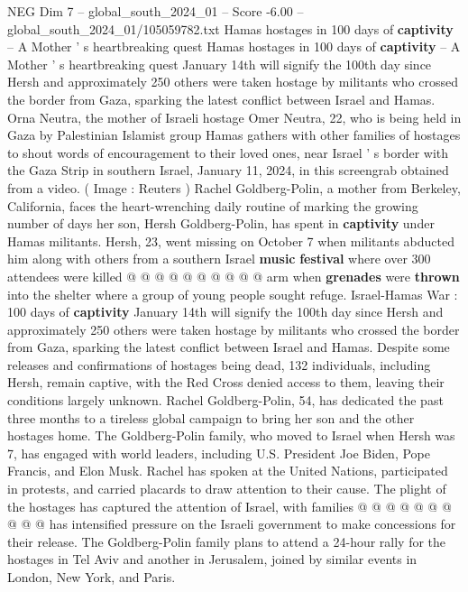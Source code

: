 \begin{textsample}{NEG Dim 7 – global\_south\_2024\_01 – Score -6.00 – global\_south\_2024\_01/105059782.txt}  \label{ex:f7_neg_404}
Hamas hostages in 100 days of \textbf{captivity} -- A Mother ' s heartbreaking quest Hamas hostages in 100 days of \textbf{captivity} -- A Mother ' s heartbreaking quest January 14th will signify the 100th day since Hersh and approximately 250 others were taken hostage by militants who crossed the border from Gaza, sparking the latest conflict between Israel and Hamas.
Orna Neutra, the mother of Israeli hostage Omer Neutra, 22, who is being held in Gaza by Palestinian Islamist group Hamas gathers with other families of hostages to shout words of encouragement to their loved ones, near Israel ' s border with the Gaza Strip in southern Israel, January 11, 2024, in this screengrab obtained from a video. ( Image : Reuters ) Rachel Goldberg-Polin, a mother from Berkeley, California, faces the heart-wrenching daily routine of marking the growing number of days her son, Hersh Goldberg-Polin, has spent in \textbf{captivity} under Hamas militants.
Hersh, 23, went missing on October 7 when militants abducted him along with others from a southern Israel \textbf{music} \textbf{festival} where over 300 attendees were killed @ @ @ @ @ @ @ @ @ @ arm when \textbf{grenades} were \textbf{thrown} into the shelter where a group of young people sought refuge.
Israel-Hamas War : 100 days of \textbf{captivity} January 14th will signify the 100th day since Hersh and approximately 250 others were taken hostage by militants who crossed the border from Gaza, sparking the latest conflict between Israel and Hamas.
Despite some releases and confirmations of hostages being dead, 132 individuals, including Hersh, remain captive, with the Red Cross denied access to them, leaving their conditions largely unknown.
Rachel Goldberg-Polin, 54, has dedicated the past three months to a tireless global campaign to bring her son and the other hostages home.
The Goldberg-Polin family, who moved to Israel when Hersh was 7, has engaged with world leaders, including U.S.
President Joe Biden, Pope Francis, and Elon Musk.
Rachel has spoken at the United Nations, participated in protests, and carried placards to draw attention to their cause.
The plight of the hostages has captured the attention of Israel, with families @ @ @ @ @ @ @ @ @ @ has intensified pressure on the Israeli government to make concessions for their release.
The Goldberg-Polin family plans to attend a 24-hour rally for the hostages in Tel Aviv and another in Jerusalem, joined by similar events in London, New York, and Paris.

\end{textsample}
